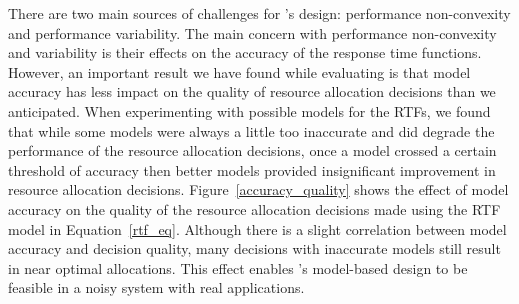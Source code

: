 There are two main sources of challenges for \pacora's design: performance non-convexity and performance variability. 
The main concern with performance non-convexity and variability is their effects on the accuracy of the response time functions.  However, an important result we have found while evaluating \pacora is that model accuracy has less impact on the quality of resource allocation decisions than we anticipated.  When experimenting with possible models for the RTFs, we found that while some models were always a little too inaccurate and did degrade the performance of the resource allocation decisions, once a model crossed a certain threshold of accuracy then better models provided insignificant improvement in resource allocation decisions. Figure~\ref{accuracy_quality} shows the effect of model accuracy on the quality of the resource allocation decisions made using the RTF model in Equation~\ref{rtf_eq}.  Although there is a slight correlation between model accuracy and decision quality, many decisions with inaccurate models still result in near optimal allocations.  This effect enables \pacora's model-based design to be feasible in a noisy system with real applications.
